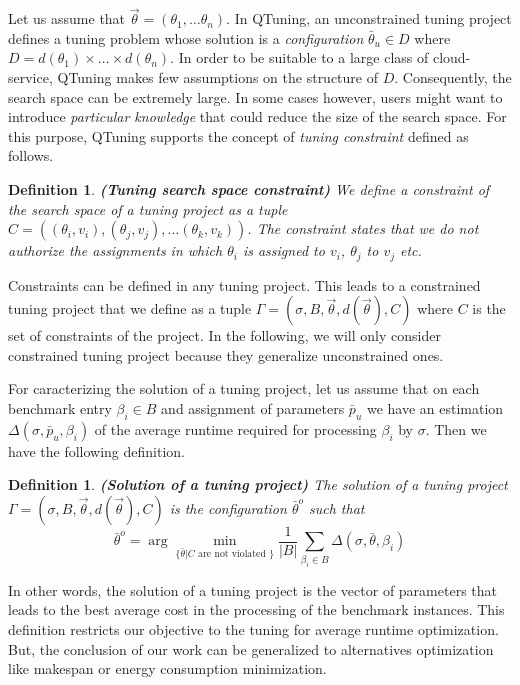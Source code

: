 \documentclass[10pt, conference, compsocconf]{IEEEtran}
\newtheorem{definition}[theorem]{Definition}
\begin{document}
Let us assume that $\vec{\theta} = (\theta_1,\dots \theta_n)$. In QTuning, an unconstrained tuning project defines
a tuning problem whose solution is a {\it configuration} $\bar{\theta}_u \in D$ where $D = d(\theta_1) \times \dots  \times d(\theta_n)$.
In order to be suitable to a large class of cloud-service, QTuning makes few assumptions on the structure of $D$.
Consequently, the search space can be extremely large.
In some cases however, users might want to introduce {\it particular knowledge} that could reduce the size of the search space.
For this purpose, QTuning supports the concept of {\it tuning constraint} defined as follows.

\begin{definition}{\bf (Tuning search space constraint)}
We define a constraint of the search space of a tuning project as a tuple $C = ((\theta_i, v_i), (\theta_j, v_j),\dots (\theta_k, v_k))$.
The constraint states that we do not authorize the assignments in which $\theta_i$ is assigned to $v_i$, $\theta_j$ to $v_j$ etc.
\end{definition}


Constraints can be defined in any tuning project. This leads to a constrained tuning project that we define
 as a tuple $ \Gamma = (\sigma, B, \vec{\theta}, d(\vec{\theta}), C)$ where $C$ is the set of constraints of the project.
In the following, we will only consider constrained tuning project because they generalize unconstrained ones.


For caracterizing the solution of a tuning project, let us assume that on each benchmark entry $\beta_i \in B$
and assignment of parameters $\bar{p}_u$ we have an estimation $\Delta(\sigma, \bar{p}_u, \beta_i)$ of the
average runtime required for processing $\beta_i$ by $\sigma$. Then we have the following definition.

\begin{definition}{\bf (Solution of a tuning project)}
The solution of a tuning project $ \Gamma = (\sigma, B, \vec{\theta}, d(\vec{\theta}), C)$  is the configuration
$\bar{\theta}^o$ such that \[ \bar{\theta}^o = \arg \underset{\{\bar{\theta} | C \text{ are not violated }\}}{\min} \frac{1}{|B|}\sum_{\beta_i \in B} \Delta(\sigma, \bar{\theta}, \beta_i) \]
\end{definition}

In other words, the solution of a tuning project is the vector of parameters that leads to the best average
cost in the processing of the benchmark instances. This definition restricts our objective to the tuning for average runtime
optimization. But, the conclusion of our work can be generalized to alternatives optimization like makespan or energy
consumption minimization.
\end{document}
